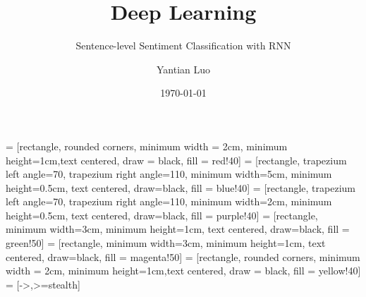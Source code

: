 \documentclass{elegantbook}
\newcommand{\upcite}[1]{\textsuperscript{\textsuperscript{\cite{#1}}}}
\renewcommand{\algorithmicrequire}{\textbf{Input: }}
\renewcommand{\algorithmicensure}{\textbf{Output: }}
\begin{document}
\usepackage[square,numbers,sort&compress]{natbib}
\newcommand{\upcite}[1]{\textsuperscript{\textsuperscript{\cite{#1}}}}
\usepackage{multirow}
\usepackage{color}
\usepackage{tikz}
\usepackage{algorithm}
\usepackage{algorithmicx}
\usepackage{algpseudocode}
\renewcommand{\algorithmicrequire}{\textbf{Input: }}
\renewcommand{\algorithmicensure}{\textbf{Output: }}
\usetikzlibrary{shapes.geometric, arrows}
 = [rectangle, rounded corners, minimum width = 2cm, minimum height=1cm,text centered, draw = black, fill = red!40]
 = [rectangle, trapezium left angle=70, trapezium right angle=110, minimum width=5cm, minimum height=0.5cm, text centered, draw=black, fill = blue!40]
 = [rectangle, trapezium left angle=70, trapezium right angle=110, minimum width=2cm, minimum height=0.5cm, text centered, draw=black, fill = purple!40]
 = [rectangle, minimum width=3cm, minimum height=1cm, text centered, draw=black, fill = green!50]
 = [rectangle, minimum width=3cm, minimum height=1cm, text centered, draw=black, fill = magenta!50]
 = [rectangle, rounded corners, minimum width = 2cm, minimum height=1cm,text centered, draw = black, fill = yellow!40]
 = [->,>=stealth]

\title{Deep Learning}
\subtitle{Sentence-level Sentiment Classification with RNN}
\author{Yantian Luo}
\date{\today}
\end{document}
